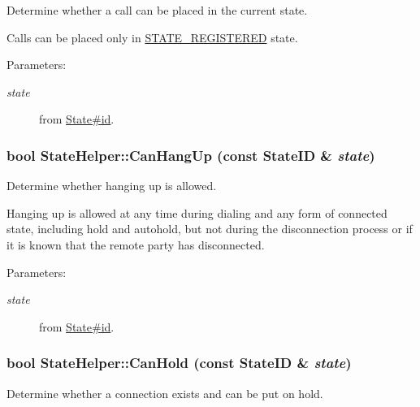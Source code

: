 Determine whether a call can be placed in the current state. 

Calls can be placed only in \hyperlink{}{STATE\_\-REGISTERED} state. \begin{Desc}
\item[Parameters:]
\begin{description}
\item[{\em state}]from \hyperlink{classState_f747db9527dfb6ea0a58fe7bfeb3ac80}{State\#id}. \end{description}
\end{Desc}
\hypertarget{classStateHelper_8ab96f1d7b7413154e5297ef22af93bb}{
\subsubsection[{CanHangUp}]{\setlength{\rightskip}{0pt plus 5cm}bool StateHelper::CanHangUp (const {\bf StateID} \& {\em state})}}
\label{classStateHelper_8ab96f1d7b7413154e5297ef22af93bb}


Determine whether hanging up is allowed. 

Hanging up is allowed at any time during dialing and any form of connected state, including hold and autohold, but not during the disconnection process or if it is known that the remote party has disconnected. \begin{Desc}
\item[Parameters:]
\begin{description}
\item[{\em state}]from \hyperlink{classState_f747db9527dfb6ea0a58fe7bfeb3ac80}{State\#id}. \end{description}
\end{Desc}
\hypertarget{classStateHelper_c946e6f713969a2092d3e2c7ec004a7a}{
\subsubsection[{CanHold}]{\setlength{\rightskip}{0pt plus 5cm}bool StateHelper::CanHold (const {\bf StateID} \& {\em state})}}
\label{classStateHelper_c946e6f713969a2092d3e2c7ec004a7a}


Determine whether a connection exists and can be put on hold. 

